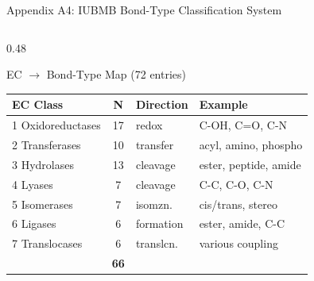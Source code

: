 \documentclass[aspectratio=169, 11pt]{beamer}
\begin{document}
\begin{frame}{Appendix A4: IUBMB Bond-Type Classification System}
\vspace{-8pt}
\begin{columns}[T]
\begin{column}{0.48\textwidth}
\begin{block}{\small EC $\rightarrow$ Bond-Type Map (72 entries)}
\vspace{-2pt}
{\scriptsize
\begin{tabular}{@{}l c l l@{}}
\toprule
\textbf{EC Class} & \textbf{N} & \textbf{Direction} & \textbf{Example} \\
\midrule
1 Oxidoreductases & 17 & redox & C-OH, C=O, C-N \\
2 Transferases & 10 & transfer & acyl, amino, phospho \\
3 Hydrolases & 13 & cleavage & ester, peptide, amide \\
4 Lyases & 7 & cleavage & C-C, C-O, C-N \\
5 Isomerases & 7 & isomzn. & cis/trans, stereo \\
6 Ligases & 6 & formation & ester, amide, C-C \\
7 Translocases & 6 & translcn. & various coupling \\
\midrule
& \textbf{66} & & \\
\bottomrule
\end{tabular}
}
\end{block}


\end{column}
\end{columns}
\end{frame}
\end{document}

